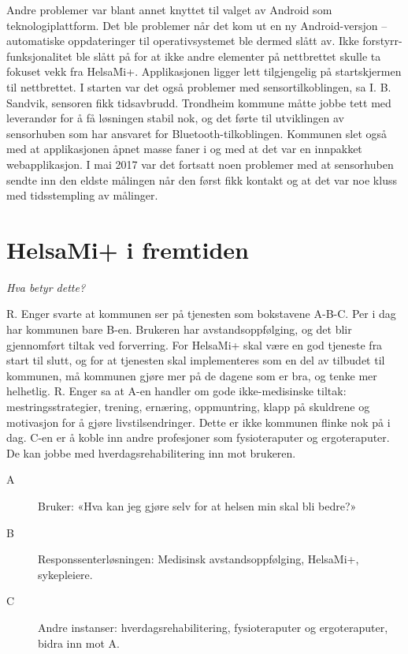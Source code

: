 Andre problemer var blant annet knyttet til valget av Android som teknologiplattform. Det ble problemer når det kom ut en ny Android-versjon --
automatiske oppdateringer til operativsystemet ble dermed slått av. Ikke forstyrr-funksjonalitet ble slått på for at ikke andre elementer
på nettbrettet skulle ta fokuset vekk fra HelsaMi+. Applikasjonen ligger lett tilgjengelig på startskjermen til nettbrettet. I starten var det også
problemer med sensortilkoblingen, sa I. B. Sandvik, sensoren fikk tidsavbrudd. Trondheim kommune måtte jobbe tett med leverandør
for å få løsningen stabil nok, og det førte
til utviklingen av sensorhuben som har ansvaret for Bluetooth-tilkoblingen.
Kommunen slet også med at applikasjonen åpnet masse faner i og med at
det var en innpakket webapplikasjon. I mai 2017 var det fortsatt noen problemer med at sensorhuben
sendte inn den eldste målingen når den først fikk kontakt og at det var noe kluss med tidsstempling av målinger.

\section{HelsaMi+ i fremtiden}
\textit{ Hva betyr dette?}

R. Enger svarte at kommunen ser på tjenesten som bokstavene A-B-C. Per i dag har kommunen bare B-en. Brukeren har avstandsoppfølging, og det blir
gjennomført tiltak ved forverring. For HelsaMi+ skal være en god tjeneste fra start til slutt, og for at tjenesten skal
implementeres som en del av tilbudet til kommunen, må kommunen gjøre mer på de dagene som er bra,
og tenke mer helhetlig. R. Enger sa at A-en handler om gode ikke-medisinske tiltak: mestringsstrategier, trening, ernæring,
oppmuntring, klapp på skuldrene og motivasjon for å gjøre livstilsendringer. Dette er ikke kommunen flinke nok på i dag. C-en er å koble
inn andre profesjoner som fysioteraputer og ergoteraputer. De kan jobbe med hverdagsrehabilitering inn mot brukeren.

\begin{description}
\item[A] Bruker: «Hva kan jeg gjøre selv for at helsen min skal bli bedre?»
\item[B] Responssenterløsningen: Medisinsk avstandsoppfølging, HelsaMi+, sykepleiere.
\item[C] Andre instanser: hverdagsrehabilitering, fysioteraputer og ergoteraputer, bidra inn mot A.
\end{description}

